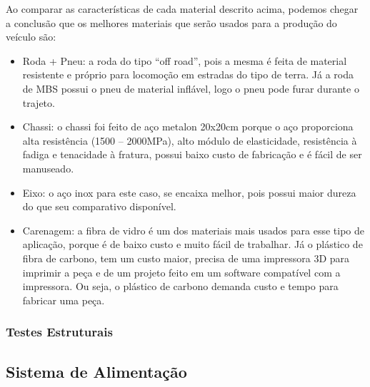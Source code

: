     \newpage

  Ao comparar as características de cada material descrito acima, podemos chegar a conclusão que os melhores materiais que
  serão usados para a produção do veículo são:

  \begin{itemize}
    \item Roda + Pneu: a roda do tipo “off road”, pois a mesma é feita de material resistente e próprio para locomoção em estradas do tipo de terra. Já a roda de MBS possui o pneu de material inflável, logo o pneu pode furar durante o trajeto.
    \item Chassi: o chassi foi feito de aço metalon 20x20cm porque o aço proporciona alta resistência (1500 – 2000MPa), alto módulo de elasticidade, resistência à fadiga e tenacidade à fratura, possui baixo custo de fabricação e é fácil de ser manuseado.
    \item Eixo: o aço inox para este caso, se encaixa melhor, pois possui maior dureza do que seu comparativo disponível.
    \item Carenagem: a fibra de vidro é um dos materiais mais usados para esse tipo de aplicação, porque é de baixo custo e muito fácil de trabalhar. Já o plástico de fibra de carbono, tem um custo maior, precisa de uma impressora 3D para imprimir a peça e de um projeto feito em um software compatível com a  impressora. Ou seja, o plástico de carbono demanda custo e tempo para fabricar uma peça.
  \end{itemize}

\subsubsection{Testes Estruturais}



  \subsection{Sistema de Alimentação}

